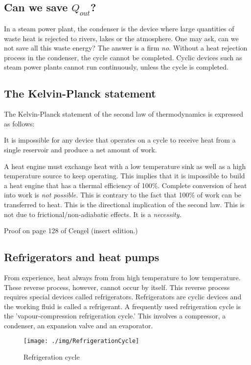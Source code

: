 \subsection{Can we save \(Q_{out}\)?}
In a steam power plant, the condenser is the device where large quantities of waste heat is rejected to rivers, lakes or the atmosphere. One may ask, can we not save all this waste energy? The answer is a firm \emph{no}. Without a heat rejection process in the condenser, the cycle cannot be completed. Cyclic devices such as steam power plants cannot run continuously, unless the cycle is completed.
\subsection{The Kelvin-Planck statement}
The Kelvin-Planck statement of the second law of thermodynamics is expressed as follows:
\begin{center}
  It is impossible for any device that operates on a cycle to receive heat from a single reservoir and produce a net amount of work.
\end{center}
A heat engine must exchange heat with a low temperature sink as well as a high temperature source to keep operating. This implies that it is impossible to build a heat engine that has a thermal efficiency of 100\%. Complete conversion of heat into work is \emph{not possible.} This is contrary to the fact that 100\% of work can be transferred to heat. This is the directional implication of the second law. This is not due to frictional/non-adiabatic effects. It is a \emph{necessity.}

Proof on page 128 of Cengel (insert edition.)
\subsection{Refrigerators and heat pumps}
From experience, heat always from from high temperature to low temperature. These reverse process, however, cannot occur by itself. This reverse process requires special devices called refrigerators. Refrigerators are cyclic devices and the working fluid is called a refrigerant. A frequently used refrigeration cycle is the 'vapour-compression refrigeration cycle.' This involves a compressor, a condenser, an expansion valve and an evaporator.
\begin{figure}[H]
  \centering
  \texttt{[image: ./img/RefrigerationCycle]}
  \caption{Refrigeration cycle}
\end{figure}
